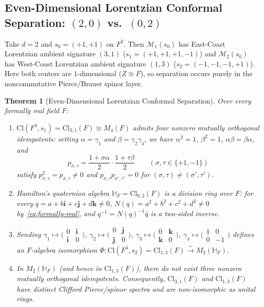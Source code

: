 \documentclass[11pt]{article}
\newtheorem{theorem}{Theorem}[section]
\theoremstyle{definition}
\newcommand{\Cl}{\mathrm{Cl}}
\begin{document}
\subsection{Even-Dimensional Lorentzian Conformal Separation: \texorpdfstring{$(2, 0)$ vs.\ $(0, 2)$}{(2, 0) vs. (0, 2)}}

Take $d = 2$ and $s_0 = (+1, +1)$ on $F^2$. Then $\mathcal{M}_1(s_0)$ has East-Coast Lorentzian ambient signature $(3, 1)$ ($s_1 = (+1, +1, +1, -1)$) and $\mathcal{M}_2(s_0)$ has West-Coast Lorentzian ambient signature $(1, 3)$ ($s_2 = (-1, -1, -1, +1)$). Here both centers are $1$-dimensional ($Z \cong F$), so separation occurs purely in the noncommutative Pierce/Brauer spinor layer.

\begin{theorem}[Even-Dimensional Lorentzian Conformal Separation]\label{thm:even-sep}
Over every formally real field $F$:
\begin{enumerate}
  \item $\Cl(F^4, s_1) = \Cl_{3,1}(F) \cong M_4(F)$ admits four nonzero mutually orthogonal idempotents: setting $\alpha = \gamma_1$ and $\beta = \gamma_2 \gamma_4$, we have $\alpha^2 = 1$, $\beta^2 = 1$, $\alpha \beta = \beta \alpha$, and
  \[
    p_{\sigma, \tau} = \frac{1 + \sigma \alpha}{2}\cdot \frac{1 + \tau \beta}{2} \qquad (\sigma, \tau \in \{+1, -1\})
  \]
  satisfy $p_{\sigma, \tau}^2 = p_{\sigma, \tau} \neq 0$ and $p_{\sigma, \tau} p_{\sigma', \tau'} = 0$ for $(\sigma, \tau) \neq (\sigma', \tau')$.
  \item Hamilton's quaternion algebra $\mathbb{H}_F = \Cl_{0,2}(F)$ is a division ring over $F$: for every $q = a + b\mathbf{i} + c\mathbf{j} + d\mathbf{k} \neq 0$, $N(q) = a^2 + b^2 + c^2 + d^2 \neq 0$ by~\eqref{eq:formally-real}, and $q^{-1} = N(q)^{-1}\bar{q}$ is a two-sided inverse.
  \item Sending $\gamma_1 \mapsto \bigl(\begin{smallmatrix}0&\mathbf{i}\\\mathbf{i}&0\end{smallmatrix}\bigr)$, $\gamma_2 \mapsto \bigl(\begin{smallmatrix}0&\mathbf{j}\\\mathbf{j}&0\end{smallmatrix}\bigr)$, $\gamma_3 \mapsto \bigl(\begin{smallmatrix}0&\mathbf{k}\\\mathbf{k}&0\end{smallmatrix}\bigr)$, $\gamma_4 \mapsto \bigl(\begin{smallmatrix}1&0\\0&-1\end{smallmatrix}\bigr)$ defines an $F$-algebra isomorphism $\Phi : \Cl(F^4, s_2) = \Cl_{1,3}(F) \xrightarrow{\sim} M_2(\mathbb{H}_F)$.
  \item In $M_2(\mathbb{H}_F)$ (and hence in $\Cl_{1,3}(F)$), there do not exist three nonzero mutually orthogonal idempotents. Consequently, $\Cl_{3,1}(F)$ and $\Cl_{1,3}(F)$ have distinct Clifford Pierce/spinor spectra and are non-isomorphic as unital rings.
\end{enumerate}
\end{theorem}
\end{document}
